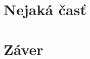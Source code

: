 \documentclass[10pt,twoside,slovak,a4paper]{article}
\begin{document}
\cite{IGN}

\section{Nejaká časť} \label{nejaka}

\cite{Reid}








\section{Záver} \label{zaver} %




\newpage

\end{document}

